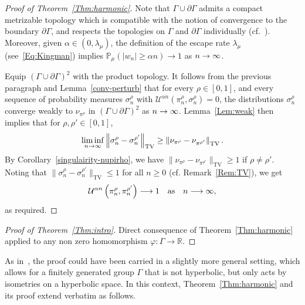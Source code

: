 \documentclass[AHL,Unicode,longabstracts,published]{cedram}
\DeclareMathOperator{\TV}{TV}
\newcommand{\cU}{\mathcal{U}}
\newcommand{\R}{\mathbb{R}}
\renewcommand{\Pr}{\mathbb{P}}
\renewcommand{\(}{\left(}
\renewcommand{\)}{\right)}
\renewcommand*{\to}{\mathchoice{\longrightarrow}{\rightarrow}{\rightarrow}{\rightarrow}}
\begin{document}
\begin{proof}[Proof of Theorem~\ref{Thm:harmonic}]
Note that $\Gamma \cup \partial \Gamma$ admits a compact metrizable topology which is compatible with the notion of convergence to the boundary $\partial \Gamma$, and respects the topologies on $\Gamma$ and $\partial \Gamma$ individually (cf.~\cite[7.2.M]{GromovHyperbolic}). Moreover, given $\alpha\in (0, \lambda_{\mu})$, the definition of the escape rate $\lambda_{\mu}$ (see~\eqref{Eq:Kingman}) implies $\Pr_{\mu}(|w_{n}|\geq \alpha n)\rightarrow 1$ as $n \to \infty$.


Equip $(\Gamma \cup \partial \Gamma)^2$ with the product topology. It follows from the previous paragraph and Lemma~\ref{conv-perturb} that for every $\rho \in [0, 1]$, and every sequence of probability measures $\sigma^\rho_{n}$ with $\cU^{\alpha n}(\pi^\rho_n, \sigma^\rho_{n})=0$, the distributions $\sigma^\rho_{n}$ converge weakly to $\nu_{\pi^\rho}$ in $(\Gamma \cup \partial \Gamma)^2$ as $n \to \infty$. Lemma~\ref{Lem:weak} then implies that for $\rho, \rho' \in [0, 1]$,
\[
\liminf_{n \to \infty}\left\|\sigma^\rho_{n}- \sigma^{\rho'}_{n}\right\|_{\TV} \ge \left\|\nu_{\pi^\rho}-\nu_{\pi^{\rho'}}\right\|_{\TV}.
\]
By Corollary~\ref{singulairity-nupirho}, we have $\|\nu_{\pi^\rho}-\nu_{\pi^{\rho'}}\|_{\TV}\ge 1$ if $\rho\neq \rho'$. Noting that $\|\sigma^\rho_{n}-\sigma^{\rho'}_{n}\|_{\TV} \le 1$ for all $n \geq 0$ (cf. Remark~\ref{Rem:TV}), we get
\[
\cU^{\alpha n}\left(\pi^\rho_{n}, \pi^{\rho'}_{n}\right)\to 1 \quad \text{as} \quad n \to \infty,
\]
as required.
\end{proof}



\begin{proof}[{Proof of Theorem~\ref{Thm:intro}}]
Direct consequence of Theorem~\ref{Thm:harmonic} applied to any non zero homomorphism $\varphi : \Gamma \rightarrow \R$.
\end{proof}




As in~\cite{BenardWinding}, the proof could have been carried in a slightly more general setting, which allows for a finitely generated group $\Gamma$ that is not hyperbolic, but only acts by isometries on a hyperbolic space. In this context, Theorem~\ref{Thm:harmonic} and its proof extend verbatim as follows.
\end{document}
